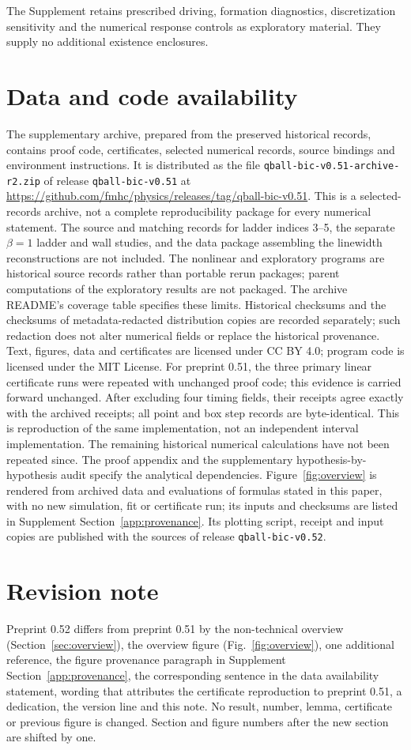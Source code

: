 \documentclass[a4paper,11pt]{article}
\begin{document}
The Supplement retains prescribed driving, formation diagnostics,
discretization sensitivity and the numerical response controls as
exploratory material. They supply no additional existence enclosures.
\section*{Data and code availability}
The supplementary archive, prepared from the preserved historical
records, contains proof code, certificates, selected numerical records,
source bindings and environment instructions. It is distributed as the
file \texttt{qball-bic-v0.51-archive-r2.zip} of release
\texttt{qball-bic-v0.51} at
\url{https://github.com/fmhc/physics/releases/tag/qball-bic-v0.51}.
This is a selected-records archive, not a complete reproducibility
package for every numerical statement. The source and matching records
for ladder indices 3--5, the separate $\beta=1$ ladder and wall studies,
and the data package assembling the linewidth reconstructions are not
included. The nonlinear and exploratory programs are historical source
records rather than portable rerun packages; parent computations of the
exploratory results are not packaged. The archive README's coverage
table specifies these limits.
Historical checksums and the checksums of metadata-redacted distribution
copies are recorded separately; such redaction does not alter numerical
fields or replace the historical provenance.
Text, figures, data and certificates are licensed under CC BY 4.0;
program code is licensed under the MIT License. For preprint 0.51, the three primary linear
certificate runs were repeated with unchanged proof code; this evidence is carried forward unchanged. After excluding
four timing fields, their receipts agree exactly with the archived
receipts; all point and box step records are byte-identical. This is
reproduction of the same implementation, not an independent interval
implementation. The remaining historical numerical calculations have not
been repeated since. The proof appendix and the
supplementary hypothesis-by-hypothesis audit specify the analytical dependencies.
Figure~\ref{fig:overview} is rendered from archived data and evaluations
of formulas stated in this paper, with no new simulation, fit or
certificate run; its inputs and checksums are listed in Supplement
Section~\ref{app:provenance}. Its plotting script, receipt and input
copies are published with the sources of release
\texttt{qball-bic-v0.52}.

\section*{Revision note}
Preprint 0.52 differs from preprint 0.51 by the non-technical overview
(Section~\ref{sec:overview}), the overview figure
(Fig.~\ref{fig:overview}), one additional reference, the figure
provenance paragraph in Supplement Section~\ref{app:provenance}, the
corresponding sentence in the data availability statement, wording that
attributes the certificate reproduction to preprint 0.51, a dedication,
the version line and this note.
No result, number, lemma, certificate or previous figure is changed.
Section and figure numbers after the new section are shifted by one.
\end{document}

